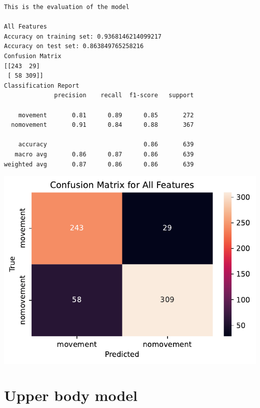 \documentclass[
  letterpaper,
  DIV=11,
  numbers=noendperiod]{scrreprt}
\begin{document}
\begin{verbatim}
This is the evaluation of the model

All Features
Accuracy on training set: 0.9368146214099217
Accuracy on test set: 0.863849765258216
Confusion Matrix
[[243  29]
 [ 58 309]]
Classification Report
              precision    recall  f1-score   support

    movement       0.81      0.89      0.85       272
  nomovement       0.91      0.84      0.88       367

    accuracy                           0.86       639
   macro avg       0.86      0.87      0.86       639
weighted avg       0.87      0.86      0.86       639
\end{verbatim}

\includegraphics{04_TS_movementAnnotation/02_MovementClassifier_final_files/figure-pdf/cell-5-output-2.pdf}

\section{Upper body model}\label{upper-body-model}
\end{document}
